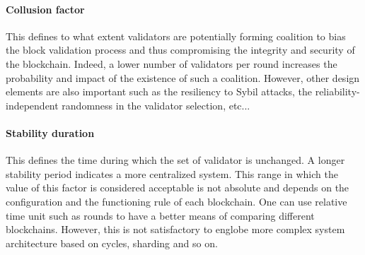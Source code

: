 \documentclass{article}
\begin{document}
\paragraph{Collusion factor} This defines to what extent validators are potentially forming coalition to bias the block validation process and thus compromising the integrity and security of the blockchain. Indeed, a lower number of validators per round increases the probability and impact of the existence of such a coalition. However, other design elements are also important such as the resiliency to Sybil attacks, the reliability-independent randomness in the validator selection, etc...


\paragraph{Stability duration} This defines the time during which the set of validator is unchanged. A longer stability period indicates a more centralized system. This range in which the value of this factor is considered acceptable is not absolute and depends on the configuration and the functioning rule of each blockchain. One can use relative time unit such as rounds to have a better means of comparing different blockchains. However, this is not satisfactory to englobe more complex system architecture based on cycles, sharding and so on.
\end{document}
